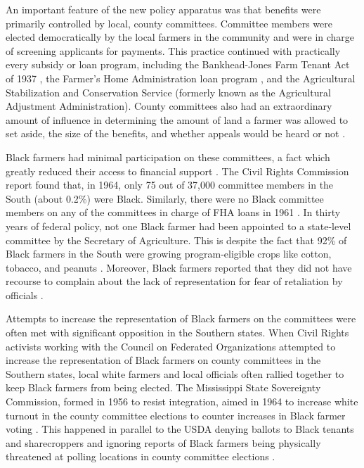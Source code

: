 \documentclass[12pt]{article}
\begin{document}
An important feature of the new policy apparatus was that benefits were primarily controlled by local, county committees. 
Committee members were elected democratically by the local farmers in the community and were in charge of screening applicants for payments. 
This practice continued with practically every subsidy or loan program, including the Bankhead-Jones Farm Tenant Act of 1937 \citep[pg. 478]{banfield_ten_1949}, the Farmer’s Home Administration loan program \citep[pg. 61]{us_commission_on_civil_rights_equal_1965}, and the Agricultural Stabilization and Conservation Service (formerly known as the Agricultural Adjustment Administration). 
County committees also had an extraordinary amount of influence in determining the amount of land a farmer was allowed to set aside, the size of the benefits, and whether appeals would be heard or not \citep{us_commission_on_civil_rights_equal_1965}. 

Black farmers had minimal participation on these committees, a fact which greatly reduced their access to financial support \citep{jones_negro_1953}.
The Civil Rights Commission report found that, in 1964, only 75 out of 37,000 committee members in the South (about 0.2\%) were Black. 
Similarly, there were no Black committee members on any of the committees in charge of FHA loans in 1961 \citep[pg. 60]{us_commission_on_civil_rights_equal_1965}. 
In thirty years of federal policy, not one Black farmer had been appointed to a state-level committee by the Secretary of Agriculture. 
This is despite the fact that 92\% of Black farmers in the South were growing program-eligible crops like cotton, tobacco, and peanuts \citep[pg. 90-91]{us_commission_on_civil_rights_equal_1965}. 
Moreover, Black farmers reported that they did not have recourse to complain about the lack of representation for fear of retaliation by officials \citep{baker_negro_1939}. 

Attempts to increase the representation of Black farmers on the committees were often met with significant opposition in the Southern states. 
When Civil Rights activists working with the Council on Federated Organizations attempted to increase the representation of Black farmers on county committees in the Southern states, local white farmers and local officials often rallied together to keep Black farmers from being elected. 
The Mississippi State Sovereignty Commission, formed in 1956 to resist integration, aimed in 1964 to increase white turnout in the county committee elections to counter increases in Black farmer voting \citep{irons_reconstituting_2010}. 
This happened in parallel to the USDA denying ballots to Black tenants and sharecroppers and ignoring reports of Black farmers being physically threatened at polling locations in county committee elections  \citep{daniel_dispossession_2013}. 
\end{document}
